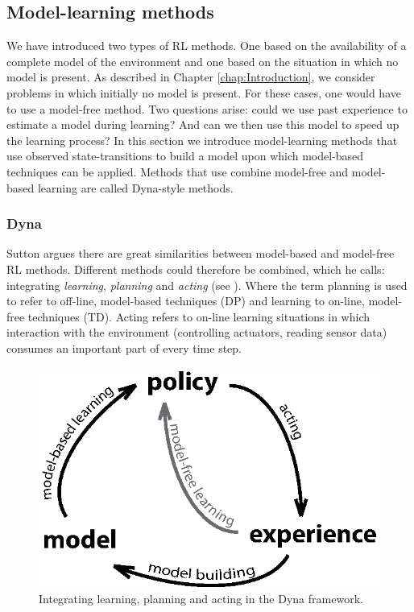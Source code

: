 \subsection{Model-learning methods} \label{sec:RL-Dyna_style_methods}
We have introduced two types of \ac{RL} methods. One based on the availability of a complete model of the environment and one based on the situation in which no model is present. As described in Chapter \ref{chap:Introduction}, we consider problems in which initially no model is present. For these cases, one would have to use a model-free method. Two questions arise: could we use past experience to estimate a model during learning? And can we then use this model to speed up the learning process? In this section we introduce model-learning methods that use observed state-transitions to build a model upon which model-based techniques can be applied. Methods that use combine model-free and model-based learning are called Dyna-style methods.

\subsubsection{Dyna} \label{sec:RL-Dyna}
Sutton \cite{Sutton:90} argues there are great similarities between model-based and model-free \ac{RL} methods. Different methods could therefore be combined, which he calls: integrating \emph{learning}, \emph{planning} and \emph{acting} (see ). Where the term planning is used to refer to off-line, model-based techniques (\ac{DP}) and learning to on-line, model-free techniques (\ac{TD}). Acting refers to on-line learning situations in which interaction with the environment (controlling actuators, reading sensor data) consumes an important part of every time step. 
\begin{figure}[htbp]
	\centering
		\includegraphics[width=.5\textwidth]{img/LearningPlanningActing}
	\caption[Dyna framework]{Integrating learning, planning and acting in the Dyna framework.}
	\label{fig:RL-integratingLearningPlanningActing}
\end{figure}

